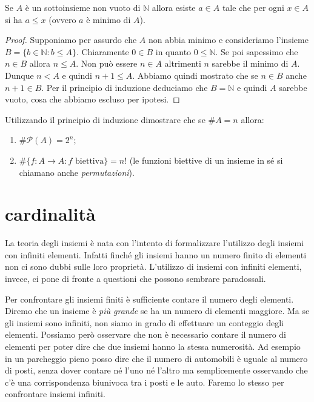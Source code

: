 \documentclass[italian,a4paper,twosides,headinclude]{scrbook}
\renewcommand{\P}{\mathcal P}
\newcommand{\NN}{\mathbb N}
\begin{document}
\begin{theorem}[buon ordinamento di $\NN$]
Se $A$ è un sottoinsieme non vuoto di $\NN$ allora esiste $a \in A$
tale che per ogni $x\in A$ si ha $a\le x$ (ovvero $a$ è minimo di $A$).
\end{theorem}
%
\begin{proof}
Supponiamo per assurdo che $A$ non abbia minimo e consideriamo l'insieme
$B=\{b\in \NN\colon b \le A\}$.
Chiaramente $0\in B$ in quanto $0\le \NN$. Se poi sapessimo che $n\in B$
allora $n\le A$. Non può essere $n\in A$ altrimenti $n$ sarebbe il minimo di $A$. Dunque $n < A$ e quindi $n+1 \le A$. Abbiamo quindi mostrato che se $n\in B$ anche $n+1\in B$. Per il principio di induzione deduciamo che $B=\NN$ e quindi $A$ sarebbe vuoto, cosa che abbiamo escluso per ipotesi.
\end{proof}

\begin{exercise}
Utilizzando il principio di induzione dimostrare che se $\# A = n$ allora:
\begin{enumerate}
    \item $\# \P(A) = 2^n$;
    \item $\# \{f\colon A \to A\colon \text{$f$ biettiva}\} = n!$
      (le funzioni biettive di un insieme in sé si chiamano anche
      \emph{permutazioni}).
\end{enumerate}
\end{exercise}

\section{cardinalità}

La teoria degli insiemi è nata con l'intento di formalizzare l'utilizzo degli
insiemi con infiniti elementi. Infatti finché gli insiemi hanno un numero finito
di elementi non ci sono dubbi sulle loro proprietà. L'utilizzo di insiemi con
infiniti elementi, invece, ci pone di fronte a questioni che possono sembrare
paradossali.

Per confrontare gli insiemi finiti è sufficiente contare il numero degli elementi.
Diremo che un insieme è \emph{più grande} se ha un numero di elementi maggiore.
Ma se gli insiemi sono infiniti, non siamo in grado di effettuare un conteggio
degli elementi. Possiamo però osservare che non è necessario contare il numero
di elementi per poter dire che due insiemi hanno la stessa numerosità.
Ad esempio in un parcheggio pieno posso dire che il numero di automobili
è uguale al numero di posti, senza dover contare né l'uno né l'altro ma semplicemente
osservando che c'è una corrispondenza biunivoca tra i posti e le auto. Faremo
lo stesso per confrontare insiemi infiniti.
\end{document}
